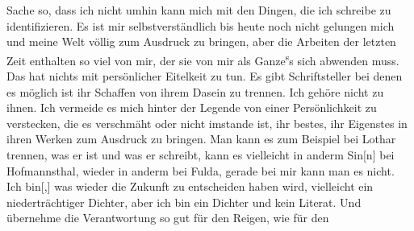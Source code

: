 \begin{ledgroupsized}[t]{13cm}
               Sache so, dass ich nicht umhin kann mich mit den Dingen, die ich schreibe zu
               identifizieren. Es ist mir selbstverständlich bis heute noch nicht gelungen mich und
               meine Welt völlig zum Ausdruck zu bringen, aber die Arbeit\introOben{}en\introOben{}
               der letzten Zeit enthalten so viel von mir, \label{T_L03520-2v}\label{T_L03520-2h} der sie \label{K_L03520-17v}\label{K_L03520-17h} von mir als Ganze\substVorne{}\textsuperscript{s}\substDazwischen{}s\substHinten{} sich abwenden muss. Das hat nichts mit persönlicher Eitelkeit zu tun. Es
               gibt Schriftsteller bei denen es möglich ist ihr Schaffen von ihrem Dasein zu
               trennen. Ich gehöre nicht zu ihnen. Ich vermeide es mich hinter der Legende von einer
               Persönlichkeit zu verstecken, die es verschmäht oder nicht imstande ist, ihr bestes,
               ihr Eigenstes in ihren Werken zum Ausdruck zu b\introOben{}r\introOben{}i\introOben{}n\introOben{}gen. Man kann es zum Beispiel {\pb}bei Lothar trennen, was er ist und was er schreibt, kann es vielleicht in anderm
                  Sin{[}n{]} bei Hofmannsthal,
               wieder in anderm bei Fulda, gerade bei mir
               kann man es nicht. Ich bin{[},{]} was wieder die Zukunft zu
               entscheiden haben wird, vielleicht ein niederträchtiger Dichter, aber ich bin ein
               Dichter und kein Literat. Und übernehme die
               Verantwortung so gut für den Reigen, wie für den

\end{ledgroupsized}
